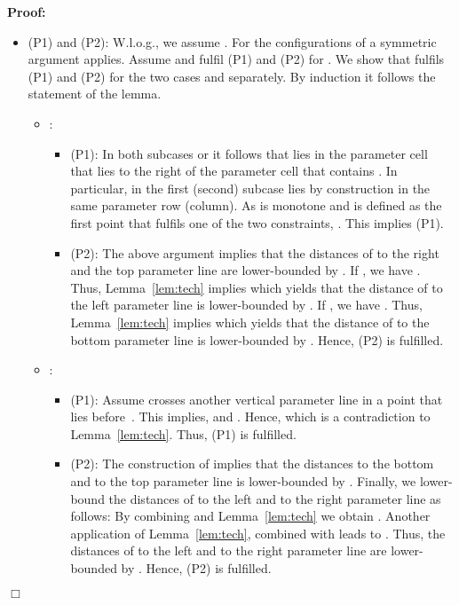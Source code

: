 \documentclass[a4paper,11pt]{article}
\newenvironment{proof}{\textbf{Proof:}}{\hspace*{0mm}\hfill\ensuremath{\Box}}
\begin{document}
\begin{proof}
\begin{itemize}
	\item (P1) and (P2): W.l.o.g., we assume . For the configurations of  a symmetric argument applies. Assume  and  fulfil (P1) and (P2) for . We show that  fulfils (P1) and  (P2) for the two cases  and  separately. By induction it follows the statement of the lemma.
		\begin{itemize}
			\item : 
				\begin{itemize}
					\item (P1): In both subcases  or  it follows that  lies in the parameter cell  that lies to the right of the parameter cell that contains . In particular, in the first (second) subcase  lies by construction in the same parameter row (column). As  is monotone and  is defined as the first point that fulfils one of the two constraints, . This implies (P1).
					\item (P2): The above argument implies that the distances of  to the right and the top parameter line are lower-bounded by . If , we have . Thus, Lemma~\ref{lem:tech} implies  which yields that the distance of  to the left parameter line is lower-bounded by . If , we have . Thus, Lemma~\ref{lem:tech} implies  which yields that the distance of  to the bottom parameter line is lower-bounded by . Hence, (P2) is fulfilled.
				\end{itemize}
			\item : 
				\begin{itemize}
					\item (P1): Assume  crosses another vertical parameter line in a point  that lies before~. This implies,  and . Hence,  which is a contradiction to Lemma~\ref{lem:tech}. Thus, (P1) is fulfilled.
					\item (P2): The construction of  implies that the distances to the bottom and to the top parameter line is lower-bounded by . Finally, we lower-bound the distances of  to the left and to the right parameter line as follows:  By combining  and Lemma~\ref{lem:tech} we obtain . Another application of Lemma~\ref{lem:tech}, combined with  leads to . Thus, the distances of  to the  left and to the right parameter line are lower-bounded by . Hence, (P2) is fulfilled.
				\end{itemize}
		\end{itemize}
\end{itemize}
\end{proof}
\end{document}
